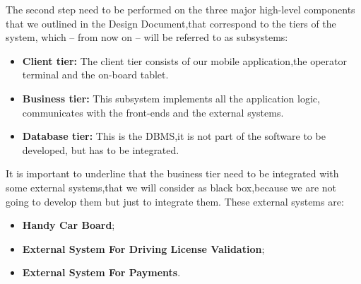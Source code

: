 The second step need to be performed on the three major high-level components that we outlined in the Design Document,that correspond to the tiers of the system, which – from now on – will
be referred to as subsystems:
\begin{itemize}
\item \textbf{Client tier:} The client tier consists of our mobile application,the operator terminal and the on-board tablet.
\item\textbf{Business tier:} This subsystem implements all the application logic, communicates with the front-ends and the external systems.
\item \textbf{Database tier:} This is the DBMS,it is not part of the software to be developed,
but has to be integrated.
\end{itemize}
It is important to underline that the business tier need to be integrated with some external systems,that we will consider as black box,because we are not going to develop them but just to integrate them. These external systems are:
\begin{itemize}
\item \textbf{Handy Car Board};
\item \textbf{External System For Driving License Validation};
\item \textbf{External System For Payments}.
\end{itemize}


